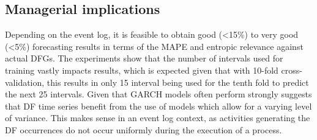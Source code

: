 \subsection{Managerial implications}
Depending on the event log, it is feasible to obtain good (\textless15\%) to very good (\textless5\%) forecasting results in terms of the MAPE and entropic relevance against actual DFGs.
The experiments show that the number of intervals used for training vastly impacts results, which is expected given that with 10-fold cross-validation, this results in only 15 interval being used for the tenth fold to predict the next 25 intervals.
Given that GARCH models often perform strongly suggests that DF time series benefit from the use of models which allow for a varying level of variance.
This makes sense in an event log context, as activities generating the DF occurrences do not occur uniformly during the execution of a process.


